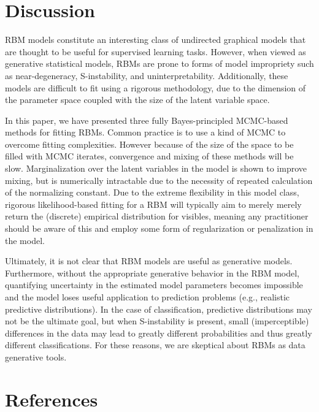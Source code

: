 \documentclass[]{article}
\theoremstyle{definition}
\begin{document}
\hypertarget{discussion}{%
\section{Discussion}\label{discussion}}

RBM models constitute an interesting class of undirected graphical
models that are thought to be useful for supervised learning tasks.
However, when viewed as generative statistical models, RBMs are prone to
forms of model impropriety such as near-degeneracy, S-instability, and
uninterpretability. Additionally, these models are difficult to fit
using a rigorous methodology, due to the dimension of the parameter
space coupled with the size of the latent variable space.

In this paper, we have presented three fully Bayes-principled MCMC-based
methods for fitting RBMs. Common practice is to use a kind of MCMC to
overcome fitting complexities. However because of the size of the space
to be filled with MCMC iterates, convergence and mixing of these methods
will be slow. Marginalization over the latent variables in the model is
shown to improve mixing, but is numerically intractable due to the
necessity of repeated calculation of the normalizing constant. Due to
the extreme flexibility in this model class, rigorous likelihood-based
fitting for a RBM will typically aim to merely merely return the
(discrete) empirical distribution for visibles, meaning any practitioner
should be aware of this and employ some form of regularization or
penalization in the model.

Ultimately, it is not clear that RBM models are useful as generative
models. Furthermore, without the appropriate generative behavior in the
RBM model, quantifying uncertainty in the estimated model parameters
becomes impossible and the model loses useful application to prediction
problems (e.g., realistic predictive distributions). In the case of
classification, predictive distributions may not be the ultimate goal,
but when S-instability is present, small (imperceptible) differences in
the data may lead to greatly different probabilities and thus greatly
different classifications. For these reasons, we are skeptical about
RBMs as data generative tools.

\hypertarget{references}{%
\section*{References}\label{references}}
\end{document}
